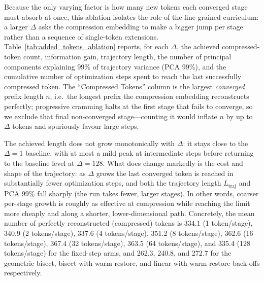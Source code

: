 Because the only varying factor is how many new tokens each converged stage must absorb at once, this ablation isolates the role of the fine-grained curriculum: a larger $\Delta$ asks the compression embedding to make a bigger jump per stage rather than a sequence of single-token extensions. Table~\ref{tab:added_tokens_ablation} reports, for each $\Delta$, the achieved compressed-token count, information gain, trajectory length, the number of principal components explaining 99\% of trajectory variance (PCA 99\%), and the cumulative number of optimization steps spent to reach the last successfully compressed token. The ``Compressed Tokens'' column is the largest \emph{converged} prefix length $n$, i.e.\ the longest prefix the compression embedding reconstructs perfectly; progressive cramming halts at the first stage that fails to converge, so we exclude that final non-converged stage---counting it would inflate $n$ by up to $\Delta$ tokens and spuriously favour large steps.

The achieved length does not grow monotonically with $\Delta$: it stays close to the $\Delta = 1$ baseline, with at most a mild peak at intermediate steps before returning to the baseline level at $\Delta = 128$. What does change markedly is the cost and shape of the trajectory: as $\Delta$ grows the last converged token is reached in substantially fewer optimization steps, and both the trajectory length $L_{\text{traj}}$ and PCA 99\% fall sharply (the run takes fewer, larger stages). In other words, coarser per-stage growth is roughly as effective at compression while reaching the limit more cheaply and along a shorter, lower-dimensional path.
Concretely, the mean number of perfectly reconstructed (compressed) tokens is 334.1 (1 token/stage), 340.9 (2 tokens/stage), 337.6 (4 tokens/stage), 351.2 (8 tokens/stage), 362.6 (16 tokens/stage), 367.4 (32 tokens/stage), 363.5 (64 tokens/stage), and 335.4 (128 tokens/stage) for the fixed-step arms, and 262.3, 240.8, and 272.7 for the geometric bisect, bisect-with-warm-restore, and linear-with-warm-restore back-offs respectively.

